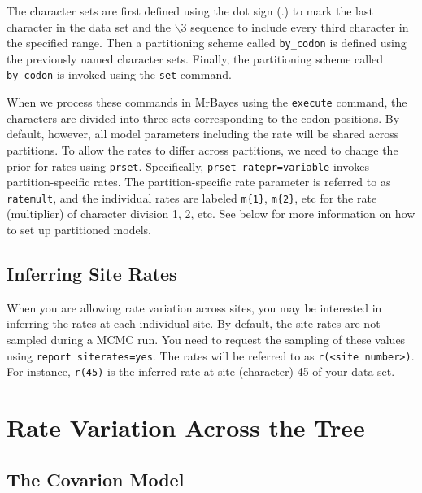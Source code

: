 \documentclass[12pt]{book}
\begin{document}
The character sets are first defined using the dot sign (.) to mark the last character in the data
set and the $\backslash$3 sequence to include every third character in the specified range. Then a
partitioning scheme called \texttt{by\_codon} is defined using the previously named character sets.
Finally, the partitioning scheme called \texttt{by\_codon} is invoked using the \texttt{set}
command.

When we process these commands in MrBayes using the \texttt{execute} command, the characters are
divided into three sets corresponding to the codon positions. By default, however, all model
parameters including the rate will be shared across partitions. To allow the rates to differ across
partitions, we need to change the prior for rates using \texttt{prset}. Specifically, \texttt{prset
ratepr=variable} invokes partition-specific rates. The partition-specific rate parameter is
referred to as \texttt{ratemult}, and the individual rates are labeled \texttt{m\{1\}},
\texttt{m\{2\}}, etc for the rate (multiplier) of character division 1, 2, etc. See below for more
information on how to set up partitioned models.

\subsection{Inferring Site Rates}

When you are allowing rate variation across sites, you may be interested in inferring the rates at
each individual site. By default, the site rates are not sampled during a MCMC run. You need to
request the sampling of these values using \texttt{report siterates=yes}. The rates will be
referred to as \texttt{r(<site number>)}. For instance, \texttt{r(45)} is the inferred rate at site
(character) 45 of your data set.

\section{Rate Variation Across the Tree}

\subsection{The Covarion Model}
\end{document}
